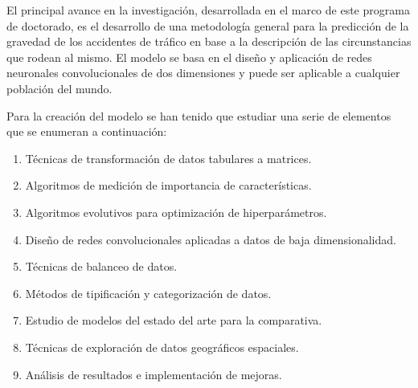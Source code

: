 \documentclass{uathesis-es}
\begin{document}
	
	El principal avance en la investigación, desarrollada en el marco de este programa de doctorado, es el desarrollo de una metodología general  para la predicción de la gravedad de los accidentes de tráfico en base a la descripción de las circunstancias que rodean al mismo. El modelo se basa en el diseño y aplicación de redes neuronales convolucionales de dos dimensiones y puede ser aplicable a cualquier población del mundo.
	
	
	
	Para la creación del modelo se han tenido que estudiar una serie de elementos que se enumeran a continuación:
	
	\begin{enumerate}
		\item Técnicas de transformación de datos tabulares a matrices.
		\item Algoritmos de medición de importancia de características. 
		\item Algoritmos evolutivos para optimización de hiperparámetros.
		\item Diseño de redes convolucionales aplicadas a datos de baja dimensionalidad.
		\item Técnicas de balanceo de datos.
		\item Métodos de tipificación y categorización de datos.
		\item Estudio de modelos del estado del arte para la comparativa. 
		\item Técnicas de exploración de datos geográficos espaciales.
		\item Análisis de resultados e implementación de mejoras.
	\end{enumerate}
	
	
\end{document}
